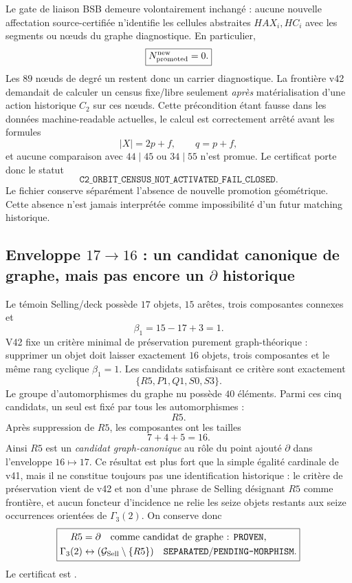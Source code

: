 \documentclass[11pt,a4paper]{article}
\newcommand{\certProven}{\texttt{PROVEN}}
\newcommand{\certSeparated}{\texttt{SEPARATED}}
\newcommand{\certPending}{\texttt{PENDING-MORPHISM}}
\begin{document}
Le gate de liaison BSB demeure volontairement inchangé : aucune nouvelle affectation source-certifiée n'identifie les cellules abstraites $HAX_i,HC_i$ avec les segments ou nœuds du graphe diagnostique. En particulier,
\[
 \boxed{N^{\rm new}_{\rm promoted}=0.}
\]
Les $89$ nœuds de degré un restent donc un carrier diagnostique. La frontière v42 demandait de calculer un census fixe/libre seulement \emph{après} matérialisation d'une action historique $C_2$ sur ces nœuds. Cette précondition étant fausse dans les données machine-readable actuelles, le calcul est correctement arrêté avant les formules
\[
 |X|=2p+f,\qquad q=p+f,
\]
et aucune comparaison avec $44\mid45$ ou $34\mid55$ n'est promue. Le certificat  porte donc le statut
\[
 \boxed{\texttt{C2\_ORBIT\_CENSUS\_NOT\_ACTIVATED\_FAIL\_CLOSED}.}
\]
Le fichier  conserve séparément l'absence de nouvelle promotion géométrique. Cette absence n'est jamais interprétée comme impossibilité d'un futur matching historique.

\subsection{Enveloppe $17\to16$ : un candidat canonique de graphe, mais pas encore un $\partial$ historique}

Le témoin Selling/deck possède $17$ objets, $15$ arêtes, trois composantes connexes et
\[
 \beta_1=15-17+3=1.
\]
V42 fixe un critère minimal de préservation purement graph-théorique : supprimer un objet doit laisser exactement $16$ objets, trois composantes et le même rang cyclique $\beta_1=1$. Les candidats satisfaisant ce critère sont exactement
\[
 \boxed{\{R5,P1,Q1,S0,S3\}.}
\]
Le groupe d'automorphismes du graphe nu possède $40$ éléments. Parmi ces cinq candidats, un seul est fixé par tous les automorphismes :
\[
 \boxed{R5.}
\]
Après suppression de $R5$, les composantes ont les tailles
\[
 \boxed{7+4+5=16.}
\]
Ainsi $R5$ est un \emph{candidat graph-canonique} au rôle du point ajouté $\partial$ dans l'enveloppe $16\mapsto17$. Ce résultat est plus fort que la simple égalité cardinale de v41, mais il ne constitue toujours pas une identification historique : le critère de préservation vient de v42 et non d'une phrase de Selling désignant $R5$ comme frontière, et aucun foncteur d'incidence ne relie les seize objets restants aux seize occurrences orientées de $\Gamma_3(2)$. On conserve donc
\[
 \boxed{\begin{aligned}
 R5&=\partial\quad\text{comme candidat de graphe : \certProven,}\\
 \Gamma_3(2)&\leftrightarrow(\mathcal G_{\rm Sell}\setminus\{R5\})
 \quad\certSeparated/\certPending.
 \end{aligned}}
\]
Le certificat est .
\end{document}
